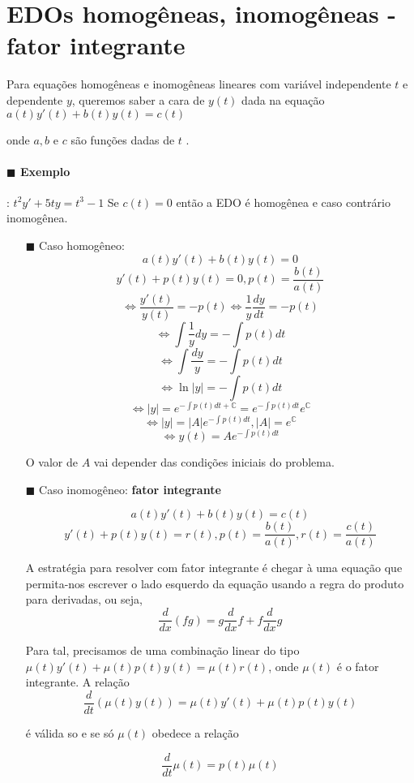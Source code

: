 \section{EDOs homogêneas, inomogêneas - fator integrante}
Para equações homogêneas e inomogêneas lineares com variável
independente \( t \) e dependente \( y \), queremos saber a
cara de \( y(t) \) dada na equação \( a(t) y'(t) + b(t) y(t) = c(t) \) 

onde \( a, b  \) e \( c \) são funções dadas de \( t \) .


\paragraph{$\blacksquare$ Exemplo}: \( t^2 y' + 5t y = t^3 - 1 \)
Se \( c(t) = 0 \) então a EDO é homogênea e caso contrário inomogênea.

\begin{itemize}
  \item[$\blacksquare$] Caso homogêneo: 
  \[ a(t) y'(t) + b(t) y(t) = 0 \]
  \[ y'(t) + p(t) y(t) = 0, p(t) = \frac{b(t)}{a(t)} \]
  \[ \Leftrightarrow \frac{y'(t)}{y(t)} = - p(t) \Leftrightarrow \frac{1}{y} \frac{dy}{dt} = -p(t) \]
  \[ \Leftrightarrow \int \frac{1}{y} dy = - \int p(t) dt \]
  \[ \Leftrightarrow  \int \frac{dy}{y} = - \int p(t) dt  \]
  \[ \Leftrightarrow  \ln |y| = - \int p(t) dt \]
  \[ \Leftrightarrow  |y| = e^{- \int p(t) dt + \mathbb{C}} = e^{-\int p(t) dt} e^{\mathbb{C}} \]
  \[ \Leftrightarrow  |y| = |A|e^{- \int p(t) dt}, |A| = e^{\mathbb{C}} \]
  \[ \Leftrightarrow  y(t) = Ae^{- \int p(t) dt}\]

  O valor de $A$ vai depender das condições iniciais do problema.
  
  \item[$\blacksquare$] Caso inomogêneo: \textbf{fator integrante}

  \[ a(t) y'(t) + b(t) y(t) = c(t) \]
  \[ y'(t) + p(t) y(t) = r(t), p(t) = \frac{b(t)}{a(t)}, r(t) = \frac{c(t)}{a(t)} \]

  A estratégia para resolver com fator integrante é chegar à uma equação
  que permita-nos escrever o lado esquerdo da equação usando a regra do produto
  para derivadas, ou seja,
  \[ \frac{d  }{d x} \left( f g \right) = g \frac{d}{dx}f  + f \frac{d}{dx}g \]

  Para tal, precisamos de uma combinação linear do tipo
  \( \mu (t) y'(t) + \mu (t) p(t) y(t) = \mu (t) r(t) \), onde \( \mu(t) \) é o fator
  integrante.
  A relação
  \[ \frac{d}{dt} \left(\mu(t) y(t) \right) = \mu(t) y'(t) + \mu(t) p(t) y(t) \] 

  é válida so e se só \( \mu(t) \) obedece a relação

  \begin{equation}
    \frac{d}{dt} \mu(t) = p(t) \mu(t) 
    \label{eq:fator_integrante}
  \end{equation}
\end{itemize}


